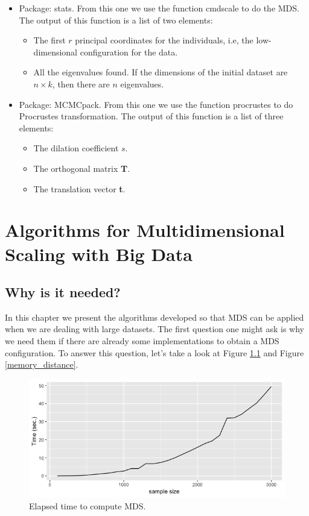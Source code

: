 \documentclass[11pt]{report}
\begin{document}
\begin{itemize}
\item Package: \textsf{stats}. From this one we use the function 
\textsf{cmdscale} to do the MDS. The output of this function is a list of 
two elements:
\begin{itemize}
\item The first $r$ principal coordinates for the individuals, i.e,
the low-dimensional configuration for the data.
\item All the eigenvalues found. If the dimensions of the initial dataset 
are $n \times k$, then there are $n$ eigenvalues.
\end{itemize}
\item Package: \textsf{MCMCpack}. From this one we use the function 
\textsf{procrustes} to do Procrustes transformation. The output of 
this function is a list of three elements:
\begin{itemize}
\item The dilation coefficient $s$.
\item The orthogonal matrix \textbf{T}.
\item The translation vector \textbf{t}.
\end{itemize}
\end{itemize}

\chapter{Algorithms for Multidimensional Scaling with Big Data}
\label{alg_mds}

\section{Why is it needed?}
In this chapter we present the algorithms developed so that MDS can be applied
when we are dealing with large datasets. The first question one might ask is 
why we need them if there are already some implementations to obtain a
MDS configuration. To answer this question, let's take a look at 
Figure \ref{elapsed_time_mds} and Figure \ref{memory_distance}.

 
\begin{figure}[!ht]
\centering
    \includegraphics[scale = 0.5]{./images/elapsed_time_mds.png}
    \caption{Elapsed time to compute MDS.}
    \label{elapsed_time_mds}
\end{figure}
\end{document}
